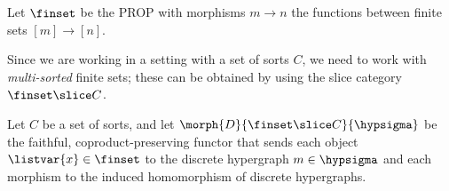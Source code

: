 \begin{definition}
    Let \(\finset\) be the PROP with morphisms \(m \to n\) the functions
    between finite sets \([m] \to [n]\).
\end{definition}

Since we are working in a setting with a set of sorts \(C\), we need to work
with \emph{multi-sorted} finite sets; these can be obtained by using the slice
category \(\finset \slice C\).

\begin{definition}
    Let \(C\) be a set of sorts, and let
    \(\morph{D}{\finset \slice C}{\hypsigma}\) be the faithful,
    coproduct-preserving functor that sends each object
    \(\listvar{x} \in \finset\) to the discrete hypergraph \(m \in \hypsigma\)
    and each morphism to the induced homomorphism of discrete hypergraphs.
\end{definition}

